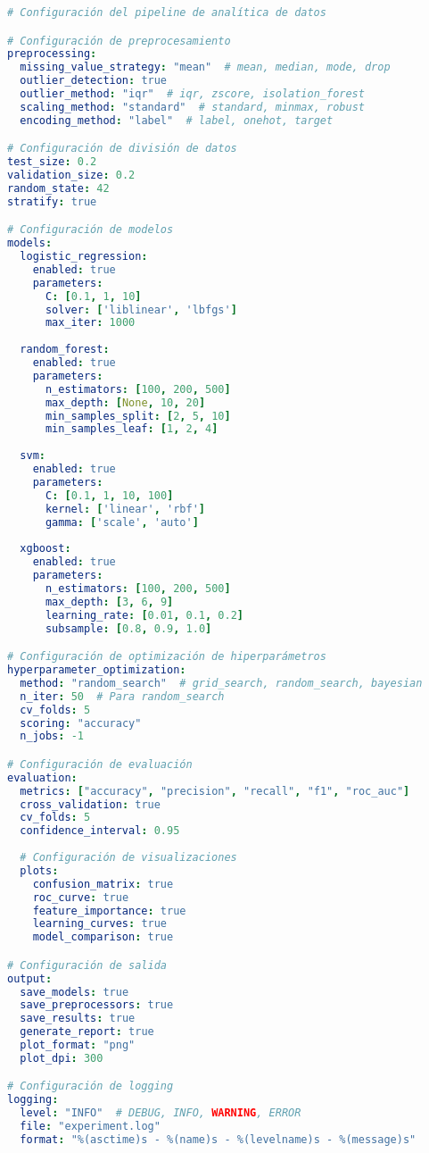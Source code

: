 \begin{lstlisting}[language=yaml, caption=Archivo de configuración config.yaml]
# Configuración del pipeline de analítica de datos

# Configuración de preprocesamiento
preprocessing:
  missing_value_strategy: "mean"  # mean, median, mode, drop
  outlier_detection: true
  outlier_method: "iqr"  # iqr, zscore, isolation_forest
  scaling_method: "standard"  # standard, minmax, robust
  encoding_method: "label"  # label, onehot, target

# Configuración de división de datos
test_size: 0.2
validation_size: 0.2
random_state: 42
stratify: true

# Configuración de modelos
models:
  logistic_regression:
    enabled: true
    parameters:
      C: [0.1, 1, 10]
      solver: ['liblinear', 'lbfgs']
      max_iter: 1000
  
  random_forest:
    enabled: true
    parameters:
      n_estimators: [100, 200, 500]
      max_depth: [None, 10, 20]
      min_samples_split: [2, 5, 10]
      min_samples_leaf: [1, 2, 4]
  
  svm:
    enabled: true
    parameters:
      C: [0.1, 1, 10, 100]
      kernel: ['linear', 'rbf']
      gamma: ['scale', 'auto']
  
  xgboost:
    enabled: true
    parameters:
      n_estimators: [100, 200, 500]
      max_depth: [3, 6, 9]
      learning_rate: [0.01, 0.1, 0.2]
      subsample: [0.8, 0.9, 1.0]

# Configuración de optimización de hiperparámetros
hyperparameter_optimization:
  method: "random_search"  # grid_search, random_search, bayesian
  n_iter: 50  # Para random_search
  cv_folds: 5
  scoring: "accuracy"
  n_jobs: -1

# Configuración de evaluación
evaluation:
  metrics: ["accuracy", "precision", "recall", "f1", "roc_auc"]
  cross_validation: true
  cv_folds: 5
  confidence_interval: 0.95
  
  # Configuración de visualizaciones
  plots:
    confusion_matrix: true
    roc_curve: true
    feature_importance: true
    learning_curves: true
    model_comparison: true

# Configuración de salida
output:
  save_models: true
  save_preprocessors: true
  save_results: true
  generate_report: true
  plot_format: "png"
  plot_dpi: 300

# Configuración de logging
logging:
  level: "INFO"  # DEBUG, INFO, WARNING, ERROR
  file: "experiment.log"
  format: "%(asctime)s - %(name)s - %(levelname)s - %(message)s"
\end{lstlisting}

